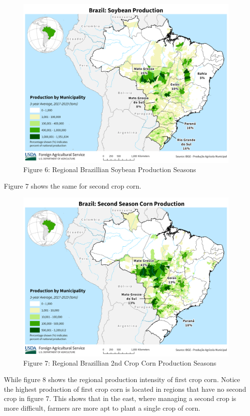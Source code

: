 \documentclass[
]{book}
\begin{document}
\begin{figure}
\centering
\includegraphics{assets/Brazil_Soybean.png}
\caption{Figure 6: Regional Brazillian Soybean Production Seasons}
\end{figure}

Figure 7 shows the same for second crop corn.

\begin{figure}
\centering
\includegraphics{assets/Brazil_SecondSeason_Corn.png}
\caption{Figure 7: Regional Brazillian 2nd Crop Corn Production Seasons}
\end{figure}

While figure 8 shows the regional production intensity of first crop corn. Notice the highest production of first crop corn is located in regions that have no second crop in figure 7. This shows that in the east, where managing a second crop is more difficult, farmers are more apt to plant a single crop of corn.
\end{document}
